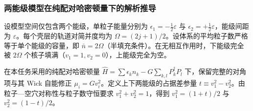 \subsubsection{两能级模型在纯配对哈密顿量下的解析推导}\label{sec:2-3-两能级模型在纯配对哈密顿量下的解析推导}


设模型空间仅包含两个能级，单粒子能量分别为 $\epsilon_1 = -\frac{1}{2}\varepsilon$ 与 $\epsilon_2 = +\frac{1}{2}\varepsilon$，能级间距为 $\varepsilon$。每个壳层的轨道对简并度均为 $\Omega = (2j+1)/2$。设体系的平均粒子数严格等于单个能级的容量，即 $\bar{n} = 2\Omega$（半填充条件）。在无相互作用时，下能级完全被 $2\Omega$ 个核子填满（$v_1 = 1, v_2 = 0$），上能级完全为空。

在本任务采用的纯配对哈密顿量 $\hat{H} = \sum \epsilon_k n_k - G \sum_{k, l} P_k^\dagger P_l$ 下，保留完整的对角项与其 Wick 自能修正 $\mu_i = G v_i^2$。定义上下两能级的占据差参量 $t \equiv v_1^2 - v_2^2$。由粒子—空穴对称性与粒子数守恒要求 $v_1^2 + v_2^2 = 1$，得到 $v_1^2 = (1+t)/2$ 与 $v_2^2 = (1-t)/2$。

